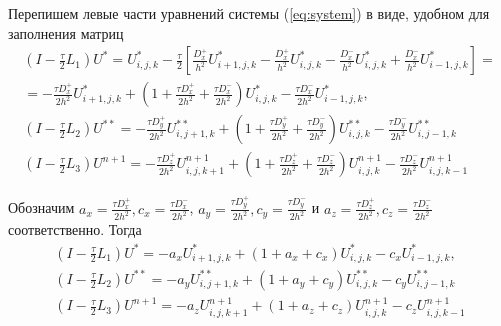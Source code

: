 \documentclass[a4paper,12pt]{article}
\begin{document}
Перепишем левые части уравнений системы (\ref{eq:system}) в виде, удобном для заполнения матриц
\begin{equation*}
  \begin{aligned}
    \left( I - \frac{\tau}{2} L_1 \right) U^{*} = U^*_{i,j,k} - \frac{\tau}{2} \left[ \frac{D^+_x}{h^2}U^*_{i+1,j,k} - \frac{D^+_x}{h^2}U^*_{i,j,k} - \frac{D^-_x}{h^2} U^*_{i,j,k} + \frac{D^-_x}{h^2}U^*_{i-1,j,k} \right] = \\
    = - \frac{\tau D^+_x}{2h^2} U^{*}_{i+1,j,k} + \left( 1 + \frac{\tau D^+_x}{2h^2} + \frac{\tau D^-_x}{2h^2} \right) U^{*}_{i,j,k} - \frac{\tau D^-_x}{2 h^2} U^{*}_{i-1,j,k}, \\
    \left( I - \frac{\tau}{2} L_2 \right) U^{**} = - \frac{\tau D^+_y}{2h^2} U^{**}_{i,j+1,k} + \left( 1  + \frac{\tau D^+_y}{2h^2} + \frac{\tau D^-_y}{2h^2} \right) U^{**}_{i,j,k} - \frac{\tau D^-_y}{2 h^2} U^{**}_{i,j-1,k}\\
    \left( I - \frac{\tau}{2} L_3 \right) U^{n+1} = - \frac{\tau D^+_z}{2h^2} U^{n+1}_{i,j,k+1} + \left( 1 + \frac{\tau D^+_z}{2h^2} + \frac{\tau D^-_z}{2h^2} \right) U^{n+1}_{i,j,k} - \frac{\tau D^-_z}{2 h^2} U^{n+1}_{i,j,k-1}
  \end{aligned}
\end{equation*}

Обозначим  $a_x = \frac{\tau D^+_x}{2h^2}, c_x = \frac{\tau D^-_x}{2h^2}$, $a_y = \frac{\tau D^+_y}{2h^2}, c_y = \frac{\tau D^-_y}{2h^2}$ и $a_z = \frac{\tau D^+_z}{2h^2}, c_z = \frac{\tau D^-_z}{2h^2}$ соответственно. Тогда
\begin{equation*}
  \begin{aligned}
    \left( I - \frac{\tau}{2} L_1 \right) U^{*} = - a_x U^{*}_{i+1,j,k} + \left( 1 + a_x + c_x \right) U^{*}_{i,j,k} - c_x U^{*}_{i-1,j,k}, \\
    \left( I - \frac{\tau}{2} L_2 \right) U^{**} = - a_y U^{**}_{i,j+1,k} + \left( 1  + a_y + c_y \right) U^{**}_{i,j,k} - c_y U^{**}_{i,j-1,k}\\
    \left( I - \frac{\tau}{2} L_3 \right) U^{n+1} = - a_z U^{n+1}_{i,j,k+1} + \left( 1 + a_z + c_z \right) U^{n+1}_{i,j,k} - c_z U^{n+1}_{i,j,k-1}
  \end{aligned}
\end{equation*}
\end{document}
